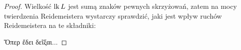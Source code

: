\begin{proof}
    Wielkość $\operatorname{lk} L$ jest sumą znaków pewnych skrzyżowań, zatem na mocy twierdzenia Reidemeistera wystarczy sprawdzić, jaki jest wpływ ruchów Reidemeistera na te składniki:
\begin{comment}
{\setlength{\intextsep}{4pt plus 2pt minus 2pt}
\begin{figure}[H]
\centering
    \begin{minipage}[b]{.3\linewidth}
        \[
            \MedLarReidemeisterOneLeft \cong \MedLarReidemeisterOneStraight
        \]
        \subcaption{ruch $R_1$}
    \end{minipage}
    \begin{minipage}[b]{.3\linewidth}
        \[
            \MedLarReidemeisterTwoLinkingA \cong \MedLarReidemeisterTwoB
        \]
        \subcaption{ruch $R_2$}
    \end{minipage}
    \begin{minipage}[b]{.35\linewidth}
        \[
            \MedLarReidemeisterThreeLinkingA \cong \MedLarReidemeisterThreeLinkingB
        \]
        \subcaption{ruch $R_3$}
    \end{minipage}
\end{figure}
}
\end{comment}
\noindent
    Ὅπερ ἔδει δεῖξαι...
\end{proof}

%

